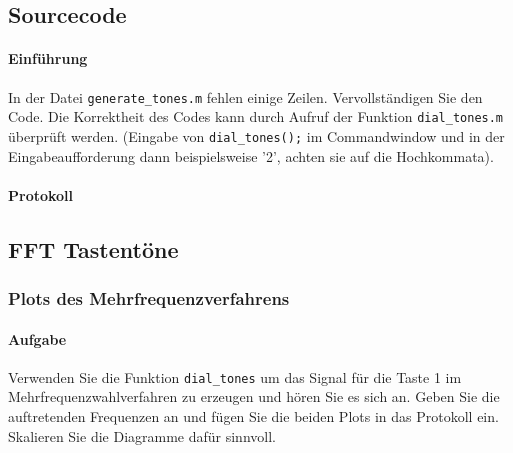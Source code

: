 \documentclass[10pt]{report}
\begin{document}
        \subsection{Sourcecode}
        \paragraph{Einführung}
        In der Datei \texttt{generate\_tones.m} fehlen einige Zeilen. Vervollständigen Sie den Code. Die
        Korrektheit des Codes kann durch Aufruf der Funktion \texttt{dial\_tones.m} überprüft werden.
        (Eingabe von \texttt{dial\_tones();} im Commandwindow und in der Eingabeaufforderung dann
        beispielsweise ’2’, achten sie auf die Hochkommata).
        \paragraph{Protokoll}
        

        \vspace{2cm}

        

        \subsection{FFT Tastentöne}
        \subsubsection{Plots des Mehrfrequenzverfahrens}
        \paragraph{Aufgabe}
        Verwenden Sie die Funktion \texttt{dial\_tones} um das Signal für die Taste
        \glqq{}1\grqq{} im Mehrfrequenzwahlverfahren
        zu erzeugen und hören Sie es sich an. Geben Sie die auftretenden
        Frequenzen an und fügen Sie die beiden Plots in das Protokoll ein. Skalieren
        Sie die Diagramme dafür sinnvoll.
\end{document}
